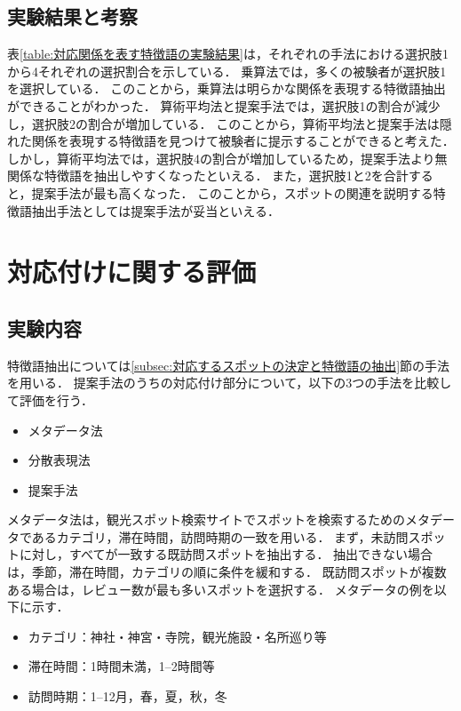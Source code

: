 \documentclass[submit]{ipsj}
\begin{document}
\subsection{実験結果と考察}
表\ref{table:対応関係を表す特徴語の実験結果}は，それぞれの手法における選択肢1から4それぞれの選択割合を示している．
乗算法では，多くの被験者が選択肢1を選択している．
このことから，乗算法は明らかな関係を表現する特徴語抽出ができることがわかった．
算術平均法と提案手法では，選択肢1の割合が減少し，選択肢2の割合が増加している．
このことから，算術平均法と提案手法は隠れた関係を表現する特徴語を見つけて被験者に提示することができると考えた．
しかし，算術平均法では，選択肢4の割合が増加しているため，提案手法より無関係な特徴語を抽出しやすくなったといえる．
また，選択肢1と2を合計すると，提案手法が最も高くなった．
このことから，スポットの関連を説明する特徴語抽出手法としては提案手法が妥当といえる．

\section{対応付けに関する評価}
\label{sec:対応付けに関する評価}
\subsection{実験内容}
特徴語抽出については\ref{subsec:対応するスポットの決定と特徴語の抽出}節の手法を用いる．
提案手法のうちの対応付け部分について，以下の3つの手法を比較して評価を行う．
\begin{itemize}
  \item メタデータ法
  \item 分散表現法
  \item 提案手法
\end{itemize}

メタデータ法は，観光スポット検索サイトでスポットを検索するためのメタデータであるカテゴリ，滞在時間，訪問時期の一致を用いる．
まず，未訪問スポットに対し，すべてが一致する既訪問スポットを抽出する．
抽出できない場合は，季節，滞在時間，カテゴリの順に条件を緩和する．
既訪問スポットが複数ある場合は，レビュー数が最も多いスポットを選択する．
メタデータの例を以下に示す．
\begin{itemize}
 \item カテゴリ：神社・神宮・寺院，観光施設・名所巡り等
 \item 滞在時間：1時間未満，1--2時間等
 \item 訪問時期：1--12月，春，夏，秋，冬
\end{itemize}
\end{document}

